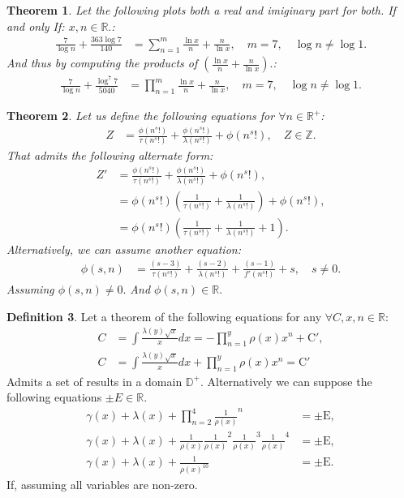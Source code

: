 \documentclass[10pt]{article}
\theoremstyle{plain}
\newtheorem{theorem}{Theorem}[section]
\theoremstyle{definition}
\newtheorem{definition}[theorem]{Definition}
\theoremstyle{remark}
\begin{document}
\begin{theorem}
	Let the following plots both a real and imiginary part for both. If and only If: $x, n \in \mathbb{R}.$:
	\begin{align*}
		\frac{7}{\log n} + \frac{363 \log 7}{140} &= \sum_{n=1}^{m} \frac{\ln x}{n} + \frac{n}{\ln x}, \quad m = 7, \quad \log n \neq \log 1.
	\end{align*}
	And thus by computing the products of $(\frac{\ln x}{n} + \frac{n}{\ln x}).$:
	\begin{align*}
		\frac{7}{\log n} + \frac{\log^{7} 7}{5040} &= \prod_{n=1}^{m} \frac{\ln x}{n} + \frac{n}{\ln x}, \quad m = 7, \quad \log n \neq \log 1.
	\end{align*}
\end{theorem}

\begin{theorem}
	Let us define the following equations for $\forall n \in \mathbb{R}^{+}$:
	\begin{align*}
		Z &= \frac{\phi(n^{s}!)}{\tau(n^{s}!)} + \frac{\phi(n^{s}!)}{\lambda(n^{s}!)} + \phi(n^{s}!), \quad Z \in \mathbb{Z}.
	\end{align*}
	That admits the following alternate form:
	\begin{align*}
		Z' &= \frac{\phi(n^{s}!)}{\tau(n^{s}!)} + \frac{\phi(n^{s}!)}{\lambda(n^{s}!)} + \phi(n^{s}!),\\
		&= \phi(n^{s}!)(\frac{1}{\tau(n^{s}!)} + \frac{1}{\lambda(n^{s}!)}) + \phi(n^{s}!),\\
		&= \phi(n^{s}!)(\frac{1}{\tau(n^{s}!)} + \frac{1}{\lambda(n^{s}!)} + 1).
	\end{align*}
	Alternatively, we can assume another equation:
	\begin{align*}
		\phi(s, n) &= \frac{(s-3)}{\tau(n^{s}!)} + \frac{(s-2)}{\lambda(n^{s}!)} + \frac{(s-1)}{f'(n^{s}!)} + s, \quad s \neq 0.
	\end{align*}
	Assuming $\phi(s, n) \neq 0.$ And $\phi(s, n) \in \mathbb{R}.$
\end{theorem}

\begin{definition}
	Let a theorem of the following equations for any $\forall C, x, n \in \mathbb{R}$:
	\begin{align*}
		C &= \int \frac{\lambda(y) \sqrt{x}}{x} dx = - \prod_{n=1}^{y}\rho(x) x^{n} + \mathrm{C}',\\
		C &= \int \frac{\lambda(y) \sqrt{x}}{x} dx + \prod_{n=1}^{y}\rho(x) x^{n} = \mathrm{C}'
	\end{align*}
	Admits a set of results in a domain $\mathbb{D}^{+}$. Alternatively we can suppose the following equations $\pm E \in \mathbb{R}.$
	\begin{align*}
		\gamma(x)+\lambda(x) + \prod_{n=2}^{4}\frac{1}{\rho(x)}^{n} &= \pm \mathrm{E},\\
		\gamma(x)+\lambda(x) + \frac{1}{\rho(x)} \frac{1}{\rho(x)}^{2} \frac{1}{\rho(x)}^{3} \frac{1}{\rho(x)}^{4} &= \pm \mathrm{E},\\
		\gamma(x)+\lambda(x) + \frac{1}{\rho(x)^{10}} &= \pm \mathrm{E}.
	\end{align*}
	If, assuming all variables are non-zero.
\end{definition}
\end{document}
